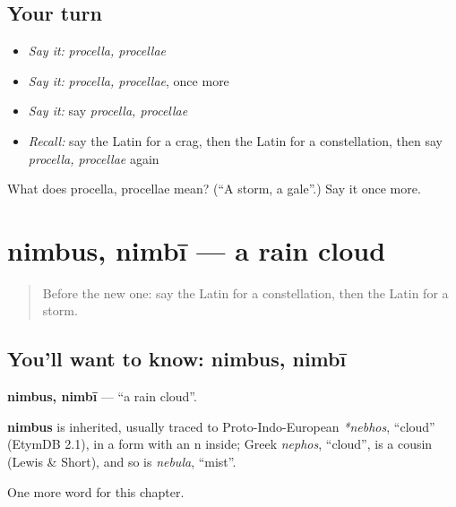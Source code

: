 \subsection*{Your turn}
\begin{itemize}
\raggedright
  \item \emph{Say it:} \emph{procella, procellae}
  \item \emph{Say it:} \emph{procella, procellae}, once more
  \item \emph{Say it:} say \emph{procella, procellae}
  \item \emph{Recall:} say the Latin for a crag, then the Latin for a constellation, then say \emph{procella, procellae} again
\end{itemize}

\begin{tcolorbox}[breakable,colback=teal!4,colframe=teal!35!black,title={Before you move on}]
What does procella, procellae mean? (\textquotedblleft{}A storm, a gale\textquotedblright{}.) Say it once more.
\end{tcolorbox}
\section[nimbus, nimbī]{nimbus, nimbī — a rain cloud}

\label{lesson:LA-C191-nimbus}



\begin{quote}
Before the new one: say the Latin for a constellation, then the Latin for a storm.
\end{quote}

\subsection*{You'll want to know: nimbus, nimbī}
\textbf{nimbus, nimbī} — \textquotedblleft{}a rain cloud\textquotedblright{}.

\begin{cousinweb}
\textbf{nimbus} is inherited, usually traced to Proto-Indo-European \emph{*nebhos}, \textquotedblleft{}cloud\textquotedblright{} (EtymDB 2.1), in a form with an n inside; Greek \emph{nephos}, \textquotedblleft{}cloud\textquotedblright{}, is a cousin (Lewis \& Short), and so is \emph{nebula}, \textquotedblleft{}mist\textquotedblright{}.
\end{cousinweb}

\begin{grammarlens}[title={What you've built}]
One more word for this chapter.
\end{grammarlens}


